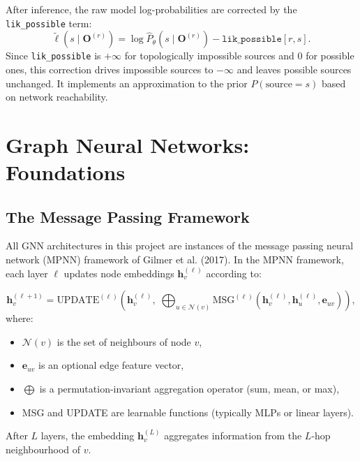 \documentclass[12pt,a4paper]{report}
\newcommand{\bh}{\mathbf{h}}
\newcommand{\calN}{\mathcal{N}}
\begin{document}
After inference, the raw model log-probabilities are corrected by the
\texttt{lik\_possible} term:
\begin{equation}
  \tilde{\ell}(s \mid \mathbf{O}^{(r)}) = \log \hat{P}_\theta(s \mid \mathbf{O}^{(r)}) - \texttt{lik\_possible}[r, s].
  \label{eq:lik_correction}
\end{equation}
Since \texttt{lik\_possible} is $+\infty$ for topologically impossible sources
and $0$ for possible ones, this correction drives impossible sources to $-\infty$
and leaves possible sources unchanged. It implements an approximation to the
prior $P(\text{source} = s)$ based on network reachability.

\chapter{Graph Neural Networks: Foundations}
\label{chap:gnn_foundations}

\section{The Message Passing Framework}

All GNN architectures in this project are instances of the message passing
neural network (MPNN) framework of Gilmer et al. (2017). In the MPNN framework,
each layer $\ell$ updates node embeddings $\bh_v^{(\ell)}$ according to:

\begin{equation}
  \bh_v^{(\ell+1)} = \text{UPDATE}^{(\ell)}\!\left(\bh_v^{(\ell)},\;
    \bigoplus_{u \in \calN(v)} \text{MSG}^{(\ell)}\!\left(\bh_v^{(\ell)}, \bh_u^{(\ell)}, \mathbf{e}_{uv}\right)\right),
  \label{eq:mpnn}
\end{equation}
where:
\begin{itemize}[noitemsep]
  \item $\calN(v)$ is the set of neighbours of node $v$,
  \item $\mathbf{e}_{uv}$ is an optional edge feature vector,
  \item $\bigoplus$ is a permutation-invariant aggregation operator (sum, mean, or max),
  \item MSG and UPDATE are learnable functions (typically MLPs or linear layers).
\end{itemize}

After $L$ layers, the embedding $\bh_v^{(L)}$ aggregates information from the
$L$-hop neighbourhood of $v$.
\end{document}
